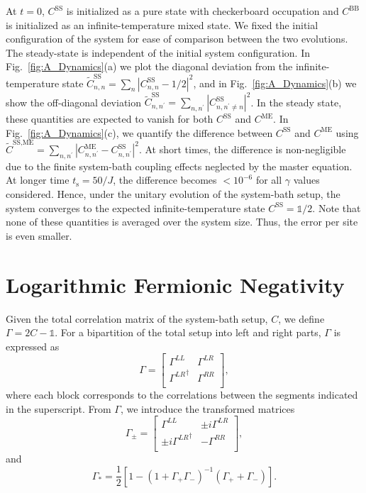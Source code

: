 \documentclass[reprint, superscriptaddress, aps, prl]{revtex4-2}
\begin{document}
At $t = 0$, $C^{\text{SS}}$ is initialized as a pure state with checkerboard occupation and $C^{\text{BB}}$ is initialized as an infinite-temperature mixed state.
We fixed the initial configuration of the system for ease of comparison between the two evolutions.
The steady-state is independent of the initial system configuration.
In Fig.~\ref{fig:A_Dynamics}(a) we plot the diagonal deviation from the infinite-temperature state $\tilde{C}_{n,n}^{\text{SS}} = \sum_{n} | C^{\text{SS}}_{n,n} - 1/2|^2$, and in Fig.~\ref{fig:A_Dynamics}(b) we show the off-diagonal deviation $\tilde{C}_{n,n^\prime}^{\text{SS}} = \sum_{n,n^\prime} | C^{\text{SS}}_{n,n^\prime\neq n} |^2$.
In the steady state, these quantities are expected to vanish for both $C^{\text{SS}}$ and $C^{\text{ME}}$.
In Fig.~\ref{fig:A_Dynamics}(c), we quantify the difference between $C^{\text{SS}}$ and $C^{\text{ME}}$ using $\tilde{C}^{\text{SS}, \text{ME}} = \sum_{n,n^\prime} | C^{\text{ME}}_{n, n^\prime} - C^{\text{SS}}_{n, n^\prime}|^2$.
At short times, the difference is non-negligible due to the finite system-bath coupling effects neglected by the master equation.
At longer time $t_{\text{s}} = 50/J$, the difference becomes $< 10^{-6}$ for all $\gamma$ values considered.
Hence, under the unitary evolution of the system-bath setup, the system converges to the expected infinite-temperature state $C^{\text{SS}}=\mathbb{1}/2$.
Note that none of these quantities is averaged over the system size. Thus, the error per site is even smaller.

\section{Logarithmic Fermionic Negativity}\label{SM:LFN}
Given the total correlation matrix of the system-bath setup, $C$, we define $\Gamma = 2C - \mathbb{1}$.
For a bipartition of the total setup into left and right parts, $\Gamma$ is expressed as
\begin{equation}
    \Gamma =
    \begin{bmatrix}
        \Gamma^{LL} & \Gamma^{LR} \\
        {\Gamma^{LR}}^\dagger & \Gamma^{RR} \\
    \end{bmatrix} ,
\end{equation}
where each block corresponds to the correlations between the segments indicated in the superscript.
From $\Gamma$, we introduce the transformed matrices
\begin{equation}
    \Gamma_\pm =
    \begin{bmatrix}
        \Gamma^{LL} & \pm i \Gamma^{LR} \\
        \pm i {\Gamma^{LR}}^\dagger & -\Gamma^{RR} \\
    \end{bmatrix} ,
\end{equation}
and
\begin{equation}
    \Gamma_* = \frac{1}{2} \left[ 1 - (1 + \Gamma_+ \Gamma_-)^{-1} (\Gamma_+ + \Gamma_-) \right] .
\end{equation}
\end{document}

